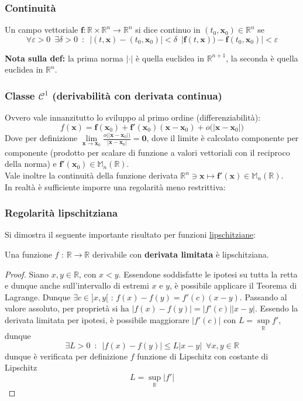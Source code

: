 \documentclass[10pt, oneside]{book}
\theoremstyle{plain}
\begin{document}
\subsubsection{Continuità} 
\begin{defin}
Un campo vettoriale $\displaystyle \mathbf{f} : \mathbb{R} \times \mathbb{R}^n \rightarrow \mathbb{R}^n$ si dice continuo in $(t_0, \mathbf{x}_0) \in \mathbb{R}^n$ se 
\[\forall \varepsilon > 0 \enspace \exists \delta > 0 \enspace : \enspace |(t,\mathbf{x}) - (t_0, \mathbf{x}_0)| < \delta \enspace |\mathbf{f}(t,\mathbf{x})) - \mathbf{f}(t_0, \mathbf{x}_0)| < \varepsilon\]
\end{defin}
\textbf{Nota sulla def:} la prima norma $|\cdot|$ è quella euclidea in $\mathbb{R}^{n+1}$, la seconda è quella euclidea in $\mathbb{R}^n$.

\subsubsection{Classe $\mathcal{C}^1$ (derivabilità con derivata continua)} Ovvero vale innanzitutto lo sviluppo al primo ordine (differenziabilità):
\[f(\mathbf{x}) = \mathbf{f}(\mathbf{x}_0) + \mathbf{f}'(\mathbf{x}_0) (\mathbf{x} - \mathbf{x}_0) + o\big(|\mathbf{x} - \mathbf{x}_0|\big)\]
Dove per definizione $\displaystyle \lim\limits_{\mathbf{x} \rightarrow \mathbf{x}_0} \frac{o\big(|\mathbf{x} - \mathbf{x}_0|\big)}{|\mathbf{x} - \mathbf{x}_0|} = \mathbf{0}$, dove il limite è calcolato componente per componente (prodotto per scalare di funzione a valori vettoriali con il reciproco della norma) e $\displaystyle \mathbf{f}'(\mathbf{x}_0) \in \mathbb{M}_n(\mathbb{R})$.
\\Vale inoltre la continuità della funzione derivata $\displaystyle \mathbb{R}^n \owns \mathbf{x} \mapsto \mathbf{f}'(\mathbf{x}) \in \mathbb{M}_n(\mathbb{R})$.
\\In realtà è sufficiente imporre una regolarità meno restrittiva:
\subsubsection{Regolarità lipschitziana}
Si dimostra il seguente importante risultato per funzioni \hyperlink{lipsc}{lipschitziane}:
\begin{prop}
Una funzione $f$ : $\mathbb{R} \rightarrow \mathbb{R}$ derivabile con \textbf{derivata limitata} è lipschitziana.
\end{prop}
\begin{proof}
Siano $x,y \in \mathbb{R}$, con $x<y$. Essendone soddisfatte le ipotesi su tutta la retta e dunque anche sull'intervallo di estremi $x$ e $y$, è possibile applicare il Teorema di Lagrange. Dunque $\exists c \in ]x,y[$ : $f(x) - f(y) = f'(c) (x - y)$. Passando al valore assoluto, per proprietà si ha $|f(x) - f(y)| = |f'(c)| |x - y|$. Essendo la derivata limitata per ipotesi, è possibile maggiorare $|f'(c)|$ con $L = \sup\limits_{\mathbb{R}} f'$, dunque 
\[\exists L > 0 \enspace : \enspace |f(x) - f(y)| \leq L |x - y| \enspace \forall x,y \in \mathbb{R}\]
dunque è verificata per definizione $f$ funzione di Lipschitz con costante di Lipschitz 
\[L = \sup\limits_{\mathbb{R}}|f'|\]
\end{proof}
\end{document}
